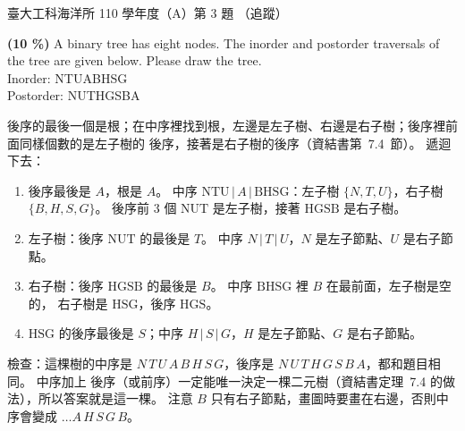 \begin{pastexam}[label={px:ntu-110-esoe-ds-03}]{臺大工科海洋所 110 學年度（A）第 3 題}
（追蹤）

\textbf{(10 \%)} A binary tree has eight nodes. The inorder and postorder traversals of the tree
are given below. Please draw the tree.\\
Inorder: \quad NTUABHSG\\
Postorder: \quad NUTHGSBA
\end{pastexam}

\begin{pastsoln}
後序的最後一個是根；在中序裡找到根，左邊是左子樹、右邊是右子樹；後序裡前面同樣個數的是左子樹的
後序，接著是右子樹的後序（資結書第~7.4~節）。 遞迴下去：
\begin{enumerate}
\item 後序最後是 $A$，根是 $A$。 中序 $\mathrm{NTU}\,|\,A\,|\,\mathrm{BHSG}$：左子樹 $\{N, T, U\}$，右子樹
$\{B, H, S, G\}$。 後序前 $3$ 個 $\mathrm{NUT}$ 是左子樹，接著 $\mathrm{HGSB}$ 是右子樹。
\item 左子樹：後序 $\mathrm{NUT}$ 的最後是 $T$。 中序 $N\,|\,T\,|\,U$，$N$ 是左子節點、$U$ 是右子節點。
\item 右子樹：後序 $\mathrm{HGSB}$ 的最後是 $B$。 中序 $\mathrm{BHSG}$ 裡 $B$ 在最前面，左子樹是空的，
右子樹是 $\mathrm{HSG}$，後序 $\mathrm{HGS}$。
\item $\mathrm{HSG}$ 的後序最後是 $S$；中序 $H\,|\,S\,|\,G$，$H$ 是左子節點、$G$ 是右子節點。
\end{enumerate}
\begin{center}
\end{center}
檢查：這棵樹的中序是 $N\,T\,U\,A\,B\,H\,S\,G$，後序是 $N\,U\,T\,H\,G\,S\,B\,A$，都和題目相同。 中序加上
後序（或前序）一定能唯一決定一棵二元樹（資結書定理~7.4 的做法），所以答案就是這一棵。 注意 $B$
只有右子節點，畫圖時要畫在右邊，否則中序會變成 $\ldots A\,H\,S\,G\,B$。
\end{pastsoln}
